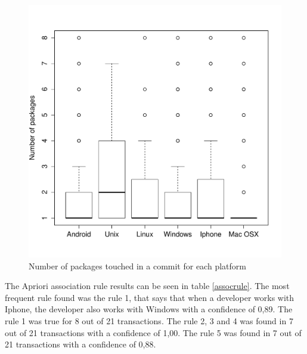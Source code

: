 \documentclass[10pt, conference]{IEEEtran}
\begin{document}

\begin{figure}[h]
\centering
\includegraphics[width=3.0
in]{packagesbyplatform}
\caption{Number of packages touched in a commit for each platform}
\label{packagesbyplatform}
\end{figure}

The Apriori association rule results can be seen in table \ref{assocrule}. The most frequent rule found was the rule 1, that says that when a developer works with Iphone, the developer also works with Windows with a confidence of 0,89. The rule 1 was true for 8 out of 21 transactions.
The rule 2, 3 and 4 was found in 7 out of 21  transactions with a confidence of 1,00. The rule 5 was found in 7 out of 21 transactions with a confidence of 0,88. 



\end{document}
